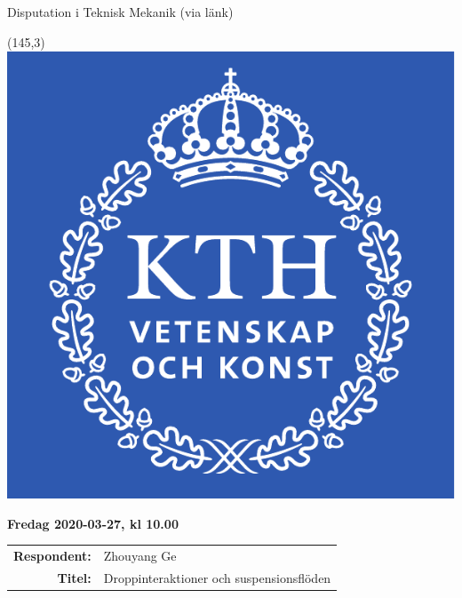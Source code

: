 \begin{frame}[plain]{Disputation i Teknisk Mekanik (via länk)}
  \protect\hypertarget{disputation-i-teknisk-mekanik}{}

  \begin{textblock}{12}(145,3)
    \includegraphics[width=\textwidth]{latex/kthgraphics/KTH-logo.pdf}
  \end{textblock}

  \textbf{Fredag 2020-03-27, kl 10.00}

  \begin{longtable}[]{@{}rl@{}}
    \toprule
    \endhead
    
    \begin{minipage}[t]{0.22\columnwidth}\raggedleft
      \textbf{Respondent:}\strut
    \end{minipage} & \begin{minipage}[t]{0.72\columnwidth}\raggedright
      Zhouyang Ge\strut
    \end{minipage}\tabularnewline

    \begin{minipage}[t]{0.22\columnwidth}\raggedleft
      \textbf{Titel:}\strut
    \end{minipage} & \begin{minipage}[t]{0.72\columnwidth}\raggedright
      Droppinteraktioner och suspensionsflöden\strut
    \end{minipage}\tabularnewline


\end{longtable}
\end{frame}
